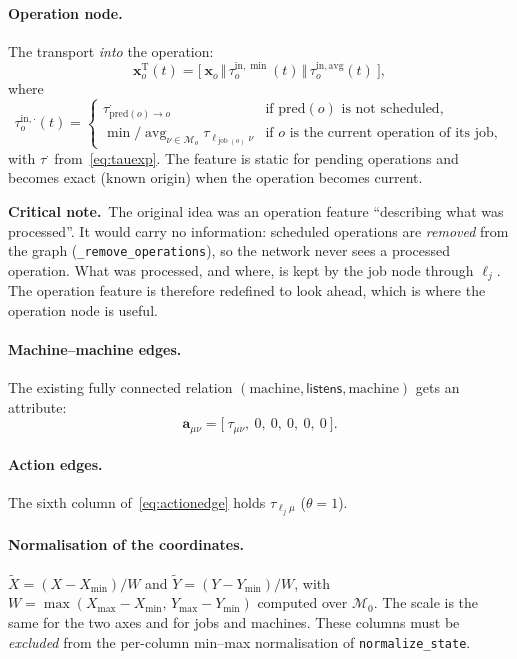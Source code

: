 \documentclass[11pt,a4paper]{article}
\newcommand{\Mset}{\mathcal{M}}
\newcommand{\job}{\operatorname{job}}
\newcommand{\cat}{\,\Vert\,}
\newcommand{\loc}{\ell}
\newcommand{\crit}[1]{\par\smallskip\noindent\textbf{Critical note.}\ #1\par\smallskip}
\begin{document}
\paragraph{Operation node.} The transport \emph{into} the operation:
\begin{equation}
  \mathbf{x}^{\mathrm{T}}_o(t)=\bigl[\ \mathbf{x}_o \cat \tau^{\mathrm{in},\min}_o(t) \cat \tau^{\mathrm{in},\mathrm{avg}}_o(t)\ \bigr],
\end{equation}
where
\begin{equation}
  \tau^{\mathrm{in},\cdot}_o(t)=
  \begin{cases}
    \tau^{\cdot}_{\mathrm{pred}(o)\to o} & \text{if } \mathrm{pred}(o) \text{ is not scheduled},\\[2pt]
    \min / \operatorname{avg}_{\nu\in\Mset_o}\tau_{\loc_{\job(o)}\nu} & \text{if } o \text{ is the current operation of its job},
  \end{cases}
\end{equation}
with $\tau^{\cdot}$ from~\eqref{eq:tauexp}. The feature is static for pending
operations and becomes exact (known origin) when the operation becomes current.

\crit{The original idea was an operation feature ``describing what was
processed''. It would carry no information: scheduled operations are
\emph{removed} from the graph (\texttt{\_remove\_operations}), so the network
never sees a processed operation. What was processed, and where, is kept by the
job node through $\loc_j$. The operation feature is therefore redefined to look
ahead, which is where the operation node is useful.}

\paragraph{Machine--machine edges.} The existing fully connected relation
$(\text{machine},\textsf{listens},\text{machine})$ gets an attribute:
\begin{equation}
  \mathbf{a}_{\mu\nu}=\bigl[\ \tau_{\mu\nu},\ 0,\ 0,\ 0,\ 0,\ 0\ \bigr].
\end{equation}

\paragraph{Action edges.} The sixth column of~\eqref{eq:actionedge} holds
$\tau_{\loc_j\mu}$ ($\theta=1$).

\paragraph{Normalisation of the coordinates.}
$\tilde X=(X-X_{\min})/W$ and $\tilde Y=(Y-Y_{\min})/W$, with
$W=\max(X_{\max}-X_{\min},\,Y_{\max}-Y_{\min})$ computed over $\Mset_0$.
The scale is the same for the two axes and for jobs and machines. These columns
must be \emph{excluded} from the per-column min--max normalisation of
\texttt{normalize\_state}.
\end{document}
